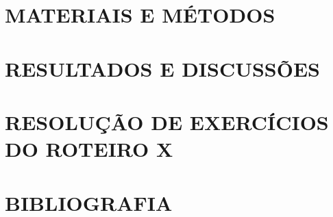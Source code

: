 \documentclass[a4paper, 12pt]{article}
\begin{document}
\section{MATERIAIS E MÉTODOS}


\section{RESULTADOS E DISCUSSÕES}


\section{RESOLUÇÃO DE EXERCÍCIOS DO ROTEIRO X}


\section{BIBLIOGRAFIA}

\begin{itemize}
\end{itemize}
\end{document}
